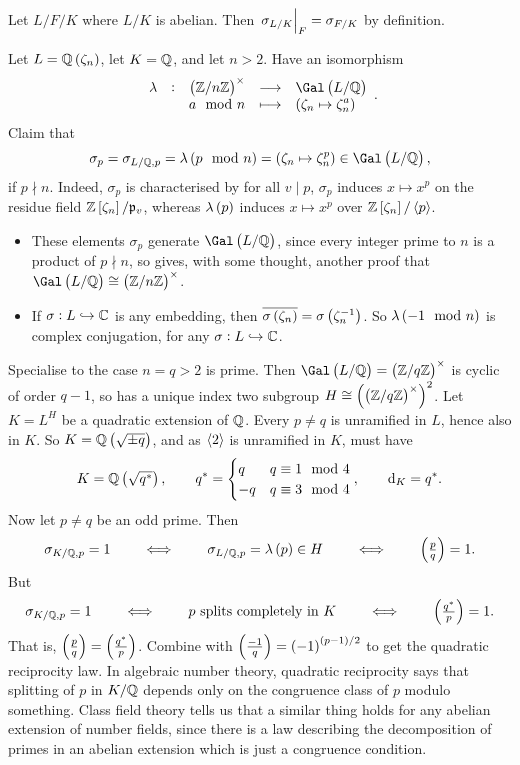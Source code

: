 \begin{remark*}
Let $ L / F / K $ where $ L / K $ is abelian. Then $ \left. \sigma_{L / K} \right|_F = \sigma_{F / K} $ by definition.
\end{remark*}

Let $ L = \QQ\br{\zeta_n} $, let $ K = \mathbb{Q} $, and let $ n > 2 $. Have an isomorphism
$$ \function[\lambda]{\br{\ZZ / n\ZZ}^\times}{\Gal\br{L / \QQ}}{a \mod n}{\br{\zeta_n \mapsto \zeta_n^a}}. $$
Claim that
$$ \sigma_p = \sigma_{L / \QQ, p} = \lambda\br{p \mod n} = \br{\zeta_n \mapsto \zeta_n^p} \in \Gal\br{L / \QQ}, $$
if $ p \nmid n $. Indeed, $ \sigma_p $ is characterised by for all $ v \mid p $, $ \sigma_p $ induces $ x \mapsto x^p $ on the residue field $ \ZZ\sbr{\zeta_n} / \ppp_v $, whereas $ \lambda\br{p} $ induces $ x \mapsto x^p $ over $ \ZZ\sbr{\zeta_n} / \abr{p} $.


\begin{remark*}
\hfill
\begin{itemize}
\item These elements $ \sigma_p $ generate $ \Gal\br{L / \QQ} $, since every integer prime to $ n $ is a product of $ p \nmid n $, so gives, with some thought, another proof that $ \Gal\br{L / \QQ} \cong \br{\ZZ / n\ZZ}^\times $.
\item If $ \sigma : L \hookrightarrow \mathbb{C} $ is any embedding, then $ \overline{\sigma\br{\zeta_n}} = \sigma\br{\zeta_n^{-1}} $. So $ \lambda\br{-1 \mod n} $ is complex conjugation, for any $ \sigma : L \hookrightarrow \mathbb{C} $.
\end{itemize}
\end{remark*}

Specialise to the case $ n = q > 2 $ is prime. Then $ \Gal\br{L / \QQ} = \br{\ZZ / q\ZZ}^\times $ is cyclic of order $ q - 1 $, so has a unique index two subgroup $ H \cong \br{\br{\ZZ / q\ZZ}^\times}^2 $. Let $ K = L^H $ be a quadratic extension of $ \mathbb{Q} $. Every $ p \ne q $ is unramified in $ L $, hence also in $ K $. So $ K = \QQ\br{\sqrt{\pm q}} $, and as $ \left\langle 2 \right\rangle $ is unramified in $ K $, must have
$$ K = \QQ\br{\sqrt{q^*}}, \qquad q^* =
\begin{cases}
q & q \equiv 1 \mod 4 \\
-q & q \equiv 3 \mod 4
\end{cases},
\qquad \d_K = q^*. $$
Now let $ p \ne q $ be an odd prime. Then
$$ \sigma_{K / \QQ, p} = 1 \qquad \iff \qquad \sigma_{L / \QQ, p} = \lambda\br{p} \in H \qquad \iff \qquad \br{\tfrac{p}{q}} = 1. $$
But
$$ \sigma_{K / \QQ, p} = 1 \qquad \iff \qquad p \ \text{splits completely in} \ K \qquad \iff \qquad \br{\tfrac{q^*}{p}} = 1. $$
That is, $ \br{\tfrac{p}{q}} = \br{\tfrac{q^*}{p}} $. Combine with $ \br{\tfrac{-1}{q}} = \br{-1}^{\br{p - 1} / 2} $ to get the quadratic reciprocity law. In algebraic number theory, quadratic reciprocity says that splitting of $ p $ in $ K / \mathbb{Q} $ depends only on the congruence class of $ p $ modulo something. Class field theory tells us that a similar thing holds for any abelian extension of number fields, since there is a law describing the decomposition of primes in an abelian extension which is just a congruence condition.


